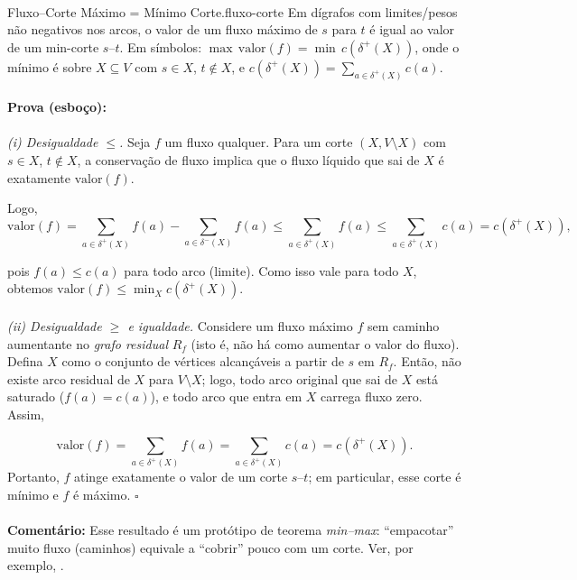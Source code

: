 \documentclass[12pt,a4paper]{article}
\begin{document}
\paragraph{}
\begin{teobox}{Fluxo–Corte Máximo = Mínimo Corte.}{fluxo-corte}
Em dígrafos com limites/pesos não negativos nos arcos, o valor de um fluxo máximo de \(s\) para \(t\) é igual ao valor de um min-corte \(s\text{--}t\). Em símbolos: \(\max\,\text{valor}(f) = \min\, c(\delta^+(X))\), onde o mínimo é sobre \(X\subseteq V\) com \(s\in X\), \(t\notin X\), e \(c(\delta^+(X))=\sum_{a\in\delta^+(X)} c(a)\).
\paragraph{}
    \textbf{Prova (esboço):}
    \paragraph{}
    \emph{(i) Desigualdade \(\le\).} Seja \(f\) um fluxo qualquer. Para um corte \((X, V\setminus X)\) com \(s\in X\), \(t\notin X\), a conservação de fluxo implica que o fluxo líquido que sai de \(X\) é exatamente \(\text{valor}(f)\).

    Logo, \[\text{valor}(f)= \sum_{a\in\delta^+(X)} f(a) - \sum_{a\in\delta^-(X)} f(a) \le \sum_{a\in\delta^+(X)} f(a) \le \sum_{a\in\delta^+(X)} c(a)=c(\delta^+(X)),\]

    pois \(f(a)\le c(a)\) para todo arco (limite). Como isso vale para todo \(X\), obtemos \(\text{valor}(f)\le \min_X c(\delta^+(X))\).

    \paragraph{}
    \emph{(ii) Desigualdade \(\ge\) e igualdade.} Considere um fluxo máximo \(f\) sem caminho aumentante no \emph{grafo residual} \(R_f\) (isto é, não há como aumentar o valor do fluxo). Defina \(X\) como o conjunto de vértices alcançáveis a partir de \(s\) em \(R_f\). Então, não existe arco residual de \(X\) para \(V\setminus X\); logo, todo arco original que sai de \(X\) está saturado (\(f(a)=c(a)\)), e todo arco que entra em \(X\) carrega fluxo zero. Assim,

    \[\text{valor}(f)=\sum_{a\in\delta^+(X)} f(a)=\sum_{a\in\delta^+(X)} c(a)=c(\delta^+(X)).\]
    Portanto, \(f\) atinge exatamente o valor de um corte \(s\text{--}t\); em particular, esse corte é mínimo e \(f\) é máximo. \hfill$\square$

\paragraph{}
\smallskip
\textbf{Comentário:} Esse resultado é um protótipo de teorema \emph{min--max}: “empacotar” muito fluxo (caminhos) equivale a “cobrir” pouco com um corte. Ver, por exemplo, \cite{schrijver2003comb}.
\end{teobox}
\end{document}

